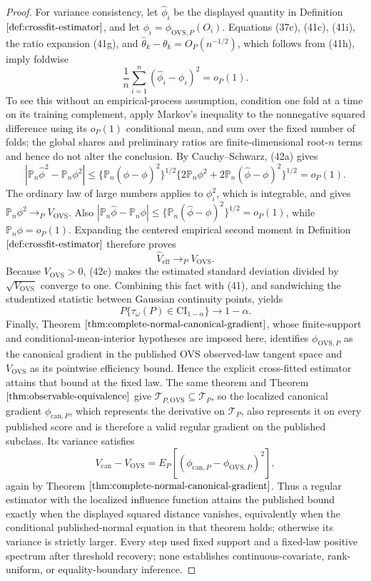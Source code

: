 \documentclass{article}
\begin{document}
\begin{proof}
For variance consistency, let \(\widehat\phi_i\) be the displayed quantity in Definition \(\ref{def:crossfit-estimator}\), and let \(\phi_i=\phi_{\mathrm{OVS},P}(O_i)\).  Equations (37c), (41c), (41i), the ratio expansion (41g), and \(\widehat\theta_k-\theta_k=O_P(n^{-1/2})\), which follows from (41h), imply foldwise
\[
\frac1n\sum_{i=1}^n(\widehat\phi_i-\phi_i)^2=o_P(1).
\tag{42a}
\]
To see this without an empirical-process assumption, condition one fold at a time on its training complement, apply Markov's inequality to the nonnegative squared difference using its \(o_P(1)\) conditional mean, and sum over the fixed number of folds; the global shares and preliminary ratios are finite-dimensional root-\(n\) terms and hence do not alter the conclusion.  By Cauchy--Schwarz, (42a) gives
\[
\left|\mathbb P_n\widehat\phi^2-\mathbb P_n\phi^2\right|
\le \{\mathbb P_n(\widehat\phi-\phi)^2\}^{1/2}
\{2\mathbb P_n\phi^2+2\mathbb P_n(\widehat\phi-\phi)^2\}^{1/2}
=o_P(1).
\tag{42b}
\]
The ordinary law of large numbers applies to \(\phi_i^2\), which is integrable, and gives \(\mathbb P_n\phi^2\to_P V_{\mathrm{OVS}}\).  Also \(|\mathbb P_n\widehat\phi-\mathbb P_n\phi|\le\{\mathbb P_n(\widehat\phi-\phi)^2\}^{1/2}=o_P(1)\), while \(\mathbb P_n\phi=o_P(1)\).  Expanding the centered empirical second moment in Definition \(\ref{def:crossfit-estimator}\) therefore proves
\[
\widehat V_{\mathrm{eff}}\longrightarrow_P V_{\mathrm{OVS}}.
\tag{42c}
\]
Because \(V_{\mathrm{OVS}}>0\), (42c) makes the estimated standard deviation divided by \(\sqrt{V_{\mathrm{OVS}}}\) converge to one.  Combining this fact with (41), and sandwiching the studentized statistic between Gaussian continuity points, yields
\[
P\{\tau_\omega(P)\in\mathrm{CI}_{1-\alpha}\}\longrightarrow1-\alpha.
\]
Finally, Theorem \(\ref{thm:complete-normal-canonical-gradient}\), whose finite-support and conditional-mean-interior hypotheses are imposed here, identifies \(\phi_{\mathrm{OVS},P}\) as the canonical gradient in the published OVS observed-law tangent space and \(V_{\mathrm{OVS}}\) as its pointwise efficiency bound.  Hence the explicit cross-fitted estimator attains that bound at the fixed law.  The same theorem and Theorem \(\ref{thm:observable-equivalence}\) give \(\mathcal T_{P,\mathrm{OVS}}\subseteq\mathcal T_P\), so the localized canonical gradient \(\phi_{\mathrm{can},P}\), which represents the derivative on \(\mathcal T_P\), also represents it on every published score and is therefore a valid regular gradient on the published subclass.  Its variance satisfies
\[
V_{\mathrm{can}}-V_{\mathrm{OVS}}
=E_P[(\phi_{\mathrm{can},P}-\phi_{\mathrm{OVS},P})^2],
\]
again by Theorem \(\ref{thm:complete-normal-canonical-gradient}\).  Thus a regular estimator with the localized influence function attains the published bound exactly when the displayed squared distance vanishes, equivalently when the conditional published-normal equation in that theorem holds; otherwise its variance is strictly larger.  Every step used fixed support and a fixed-law positive spectrum after threshold recovery; none establishes continuous-covariate, rank-uniform, or equality-boundary inference.
\end{proof}
\end{document}
